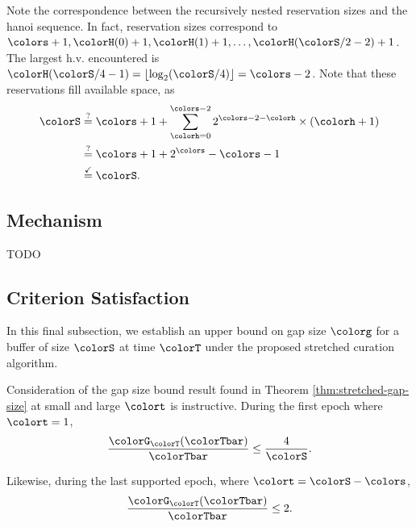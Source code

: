 Note the correspondence between the recursively nested reservation sizes and the hanoi sequence.
In fact, reservation sizes correspond to $\colors + 1, \colorH(0) + 1, \colorH(1) + 1, \ldots, \colorH(\colorS/2 - 2) + 1$.
The largest h.v. encountered is $\colorH(\colorS/4 - 1) = \left\lfloor \log_2(\colorS/4) \right\rfloor = \colors - 2$.
Note that these reservations fill available space, as
\begin{align*}
\colorS
&\stackrel{?}{=}
\colors + 1
+  \sum_{\colorh = 0}^{\colors - 2}
2^{\colors - 2 - \colorh} \times (\colorh + 1)\\
&\stackrel{?}{=}
\colors + 1 +
2^{\colors} - \colors - 1\\
&\stackrel{\checkmark}{=}
\colorS.
\end{align*}

\subsection{Mechanism}



TODO

\subsection{Criterion Satisfaction}

In this final subsection, we establish an upper bound on gap size $\colorg$ for a buffer of size $\colorS$ at time $\colorT$ under the proposed stretched curation algorithm.





Consideration of the gap size bound result found in Theorem \ref{thm:stretched-gap-size} at small and large $\colort$ is instructive.
During the first epoch where $\colort = 1$,
\begin{align*}
\frac{\colorG_{\colorT}(\colorTbar)}{\colorTbar}
\leq
\frac{4}{\colorS}.
\end{align*}

Likewise, during the last supported epoch, where $\colort = \colorS - \colors$,
\begin{align*}
\frac{\colorG_{\colorT}(\colorTbar)}{\colorTbar}
\leq
2.
\end{align*}
